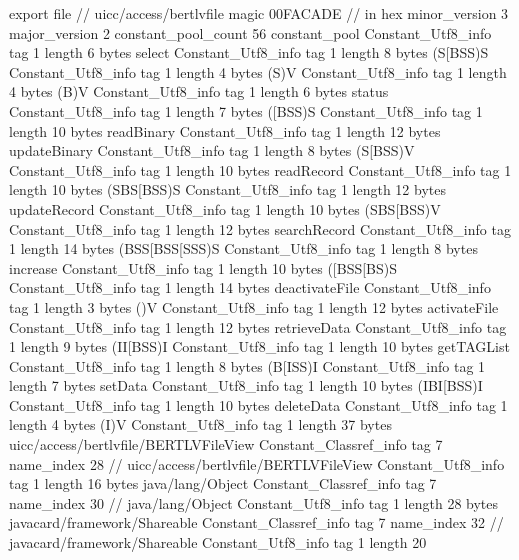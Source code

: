 export file {		// uicc/access/bertlvfile
	magic	00FACADE		 // in hex
	minor_version	3
	major_version	2
	constant_pool_count	56
	constant_pool {
		Constant_Utf8_info {
			tag	1
			length	6
			bytes	select
		}
		Constant_Utf8_info {
			tag	1
			length	8
			bytes	(S[BSS)S
		}
		Constant_Utf8_info {
			tag	1
			length	4
			bytes	(S)V
		}
		Constant_Utf8_info {
			tag	1
			length	4
			bytes	(B)V
		}
		Constant_Utf8_info {
			tag	1
			length	6
			bytes	status
		}
		Constant_Utf8_info {
			tag	1
			length	7
			bytes	([BSS)S
		}
		Constant_Utf8_info {
			tag	1
			length	10
			bytes	readBinary
		}
		Constant_Utf8_info {
			tag	1
			length	12
			bytes	updateBinary
		}
		Constant_Utf8_info {
			tag	1
			length	8
			bytes	(S[BSS)V
		}
		Constant_Utf8_info {
			tag	1
			length	10
			bytes	readRecord
		}
		Constant_Utf8_info {
			tag	1
			length	10
			bytes	(SBS[BSS)S
		}
		Constant_Utf8_info {
			tag	1
			length	12
			bytes	updateRecord
		}
		Constant_Utf8_info {
			tag	1
			length	10
			bytes	(SBS[BSS)V
		}
		Constant_Utf8_info {
			tag	1
			length	12
			bytes	searchRecord
		}
		Constant_Utf8_info {
			tag	1
			length	14
			bytes	(BSS[BSS[SSS)S
		}
		Constant_Utf8_info {
			tag	1
			length	8
			bytes	increase
		}
		Constant_Utf8_info {
			tag	1
			length	10
			bytes	([BSS[BS)S
		}
		Constant_Utf8_info {
			tag	1
			length	14
			bytes	deactivateFile
		}
		Constant_Utf8_info {
			tag	1
			length	3
			bytes	()V
		}
		Constant_Utf8_info {
			tag	1
			length	12
			bytes	activateFile
		}
		Constant_Utf8_info {
			tag	1
			length	12
			bytes	retrieveData
		}
		Constant_Utf8_info {
			tag	1
			length	9
			bytes	(II[BSS)I
		}
		Constant_Utf8_info {
			tag	1
			length	10
			bytes	getTAGList
		}
		Constant_Utf8_info {
			tag	1
			length	8
			bytes	(B[ISS)I
		}
		Constant_Utf8_info {
			tag	1
			length	7
			bytes	setData
		}
		Constant_Utf8_info {
			tag	1
			length	10
			bytes	(IBI[BSS)I
		}
		Constant_Utf8_info {
			tag	1
			length	10
			bytes	deleteData
		}
		Constant_Utf8_info {
			tag	1
			length	4
			bytes	(I)V
		}
		Constant_Utf8_info {
			tag	1
			length	37
			bytes	uicc/access/bertlvfile/BERTLVFileView
		}
		Constant_Classref_info {
			tag	7
			name_index	28		// uicc/access/bertlvfile/BERTLVFileView
		}
		Constant_Utf8_info {
			tag	1
			length	16
			bytes	java/lang/Object
		}
		Constant_Classref_info {
			tag	7
			name_index	30		// java/lang/Object
		}
		Constant_Utf8_info {
			tag	1
			length	28
			bytes	javacard/framework/Shareable
		}
		Constant_Classref_info {
			tag	7
			name_index	32		// javacard/framework/Shareable
		}
		Constant_Utf8_info {
			tag	1
			length	20
}}}
